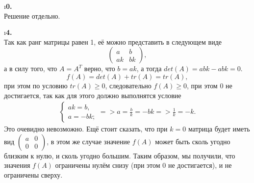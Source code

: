 \i \textbf{0.}\\
Решение отдельно.


\i \textbf{4.}\\
Так как ранг матрицы равен 1, её можно представить в следующем виде
$$\begin{pmatrix}
    a&b \\ ak& bk
\end{pmatrix},$$
а в силу того, что $A = A^T$ верно, что $b = ak$, а тогда $det(A) = abk - abk = 0$.
$$f(A) = det(A) + tr(A) = tr(A),$$
при этом по условию $tr(A) \geq 0$, следовательно $f(A) \geq 0$, при этом 0 не достигается,
так как для этого должно выполнятся условие
\begin{gather*}
    \begin{cases}
        ak = b,\\
        a = -bk;
    \end{cases} =>
    a = \frac{b}{k} = -bk =>
    \frac{1}{k} = -k.
\end{gather*}
Это очевидно невозможно. Ещё стоит сказать, что при $k = 0$ матрица будет иметь вид $\begin{pmatrix} a&0 \\ 0&0 \end{pmatrix}$, в этом же случае значение $f(A)$ может быть сколь угодно близким к нулю, и сколь угодно большим. Таким образом, мы получили, что значения $f(A)$ ограничены нулём снизу (при этом 0 не достигается), и не ограничены сверху.